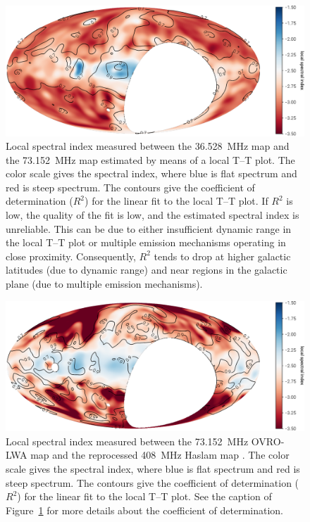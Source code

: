 \documentclass[twocolumn]{aastex61}
\begin{document}
\begin{figure}[t]
    \centering
    \includegraphics[width=\textwidth]{figures/spectral-index/better-internal-spectral-index}
    \caption{
        Local spectral index measured between the 36.528~MHz map and the 73.152~MHz map estimated by
        means of a local T--T plot. The color scale gives the spectral index, where blue is flat
        spectrum and red is steep spectrum. The contours give the coefficient of determination
        ($R^2$) for the linear fit to the local T--T plot. If $R^2$ is low, the quality of the fit
        is low, and the estimated spectral index is unreliable. This can be due to either
        insufficient dynamic range in the local T--T plot or multiple emission mechanisms operating
        in close proximity. Consequently, $R^2$ tends to drop at higher galactic latitudes (due to
        dynamic range) and near  regions in the galactic plane (due to multiple emission
        mechanisms).
    }
    \label{fig:internal-spectral-index}
\end{figure}

\begin{figure}[t]
    \centering
    \includegraphics[height=0.32\textheight]{figures/haslam/better-haslam-spectral-index}
    \caption{
        Local spectral index measured between the 73.152~MHz OVRO-LWA map and the reprocessed
        408~MHz Haslam map \citep{2015MNRAS.451.4311R}.  The color scale gives the spectral index,
        where blue is flat spectrum and red is steep spectrum. The contours give the coefficient of
        determination ($R^2$) for the linear fit to the local T--T plot. See the caption of
        Figure~\ref{fig:internal-spectral-index} for more details about the coefficient of
        determination.
    }
    \label{fig:haslam-spectral-index}
\end{figure}
\end{document}
